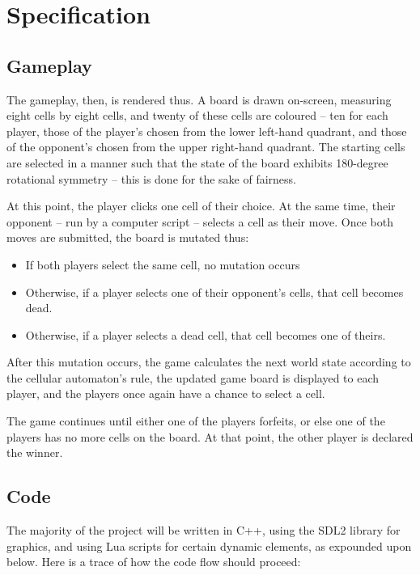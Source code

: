 \documentclass[letterpaper]{article}
\begin{document}
\section{Specification}

\subsection{Gameplay}

The gameplay, then, is rendered thus. A board is drawn on-screen, measuring eight cells by eight cells, and twenty of these cells are coloured -- ten for each player, those of the player's chosen from the lower left-hand quadrant, and those of the opponent's chosen from the upper right-hand quadrant. The starting cells are selected in a manner such that the state of the board exhibits 180-degree rotational symmetry -- this is done for the sake of fairness.

At this point, the player clicks one cell of their choice. At the same time, their opponent -- run by a computer script -- selects a cell as their move. Once both moves are submitted, the board is mutated thus:

\begin{itemize}
	\item If both players select the same cell, no mutation occurs
	\item Otherwise, if a player selects one of their opponent's cells, that cell becomes dead.
	\item Otherwise, if a player selects a dead cell, that cell becomes one of theirs.
\end{itemize}

After this mutation occurs, the game calculates the next world state according to the cellular automaton's rule, the updated game board is displayed to each player, and the players once again have a chance to select a cell.

The game continues until either one of the players forfeits, or else one of the players has no more cells on the board. At that point, the other player is declared the winner.

\subsection{Code}

The majority of the project will be written in C++, using the SDL2 library for graphics, and using Lua scripts for certain dynamic elements, as expounded upon below. Here is a trace of how the code flow should proceed:
\end{document}
